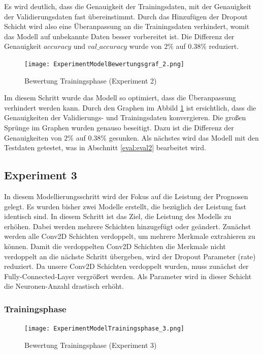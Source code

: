 \documentclass[12pt]{scrreprt}
\begin{document}
Es wird deutlich, dass die Genauigkeit der Trainingsdaten, mit der Genauigkeit der Validierungsdaten fast übereinstimmt. Durch das Hinzufügen der Dropout Schicht wird also eine Überanpassung an die Trainingsdaten verhindert, womit das Modell auf unbekannte Daten besser vorbereitet ist. Die Differenz der Genauigkeit $accuracy$ und $val\_accuracy$ wurde von $2\%$ auf  $0.38\%$ reduziert.
\begin{figure}[h!]
	\centering
	\texttt{[image: ExperimentModelBewertungsgraf\_2.png]}
	\caption{ Bewertung Trainingsphase \cite{HK22}(Experiment 2)}
	\label{fig:fig28}
\end{figure}

Im diesem Schritt wurde das Modell so optimiert, dass die Überanpassung verhindert werden kann. Durch den Graphen im Abbild \ref{fig:fig28} ist ersichtlich, dass die Genauigkeiten der Validierungs- und Trainingsdaten konvergieren. Die großen Sprünge im Graphen wurden genauso beseitigt. Dazu ist die Differenz der Genauigkeiten von $2\%$ auf $0.38\%$ gesunken. Als nächstes wird das Modell mit den Testdaten getestet, was in Abschnitt \ref{eval:eval2} bearbeitet wird.

\subsection{Experiment 3}\label{model:ep3}

In diesem Modellierungsschritt wird der Fokus auf die Leistung der Prognosen gelegt. Es wurden bisher zwei Modelle erstellt, die bezüglich der Leistung  fast identisch sind. In diesem Schritt ist das Ziel, die Leistung des Modells zu erhöhen. Dabei werden mehrere Schichten hinzugefügt oder geändert. Zunächst werden alle Conv2D Schichten verdoppelt, um mehrere Merkmale extrahieren zu können. Damit die verdoppelten Conv2D Schichten die Merkmale nicht verdoppelt an die nächste Schritt übergeben, wird der Dropout Parameter (rate) reduziert. Da unsere Conv2D Schichten verdoppelt wurden, muss zunächst der Fully-Connected-Layer vergrößert werden. Als Parameter wird in dieser Schicht die Neuronen-Anzahl drastisch erhöht.

\subsubsection{Trainingsphase}


\begin{figure}[h!]
	\centering
	\texttt{[image: ExperimentModelTrainingsphase\_3.png]}
	\caption{ Bewertung Trainingsphase \cite{HK22}(Experiment 3)}
	\label{fig:fig31}
\end{figure}
\end{document}
